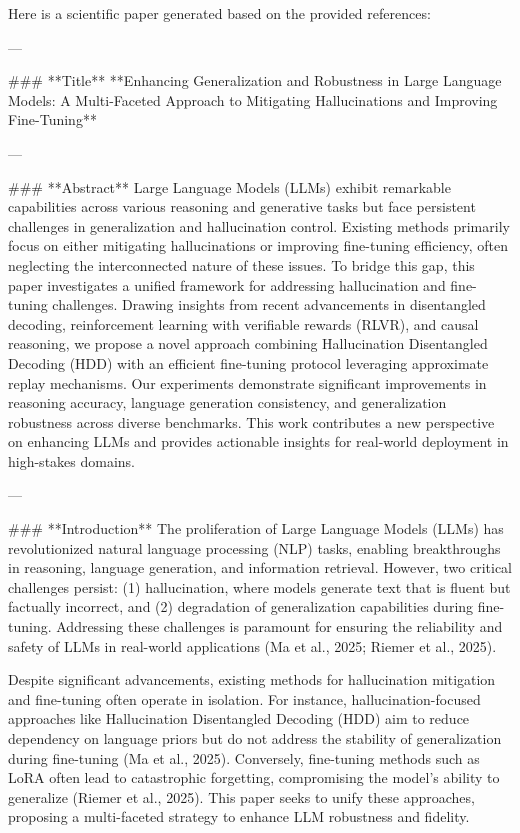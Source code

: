 Here is a scientific paper generated based on the provided references:

---

### **Title**  
**Enhancing Generalization and Robustness in Large Language Models: A Multi-Faceted Approach to Mitigating Hallucinations and Improving Fine-Tuning**

---

### **Abstract**  
Large Language Models (LLMs) exhibit remarkable capabilities across various reasoning and generative tasks but face persistent challenges in generalization and hallucination control. Existing methods primarily focus on either mitigating hallucinations or improving fine-tuning efficiency, often neglecting the interconnected nature of these issues. To bridge this gap, this paper investigates a unified framework for addressing hallucination and fine-tuning challenges. Drawing insights from recent advancements in disentangled decoding, reinforcement learning with verifiable rewards (RLVR), and causal reasoning, we propose a novel approach combining Hallucination Disentangled Decoding (HDD) with an efficient fine-tuning protocol leveraging approximate replay mechanisms. Our experiments demonstrate significant improvements in reasoning accuracy, language generation consistency, and generalization robustness across diverse benchmarks. This work contributes a new perspective on enhancing LLMs and provides actionable insights for real-world deployment in high-stakes domains.

---

### **Introduction**  
The proliferation of Large Language Models (LLMs) has revolutionized natural language processing (NLP) tasks, enabling breakthroughs in reasoning, language generation, and information retrieval. However, two critical challenges persist: (1) hallucination, where models generate text that is fluent but factually incorrect, and (2) degradation of generalization capabilities during fine-tuning. Addressing these challenges is paramount for ensuring the reliability and safety of LLMs in real-world applications (Ma et al., 2025; Riemer et al., 2025).

Despite significant advancements, existing methods for hallucination mitigation and fine-tuning often operate in isolation. For instance, hallucination-focused approaches like Hallucination Disentangled Decoding (HDD) aim to reduce dependency on language priors but do not address the stability of generalization during fine-tuning (Ma et al., 2025). Conversely, fine-tuning methods such as LoRA often lead to catastrophic forgetting, compromising the model's ability to generalize (Riemer et al., 2025). This paper seeks to unify these approaches, proposing a multi-faceted strategy to enhance LLM robustness and fidelity.

